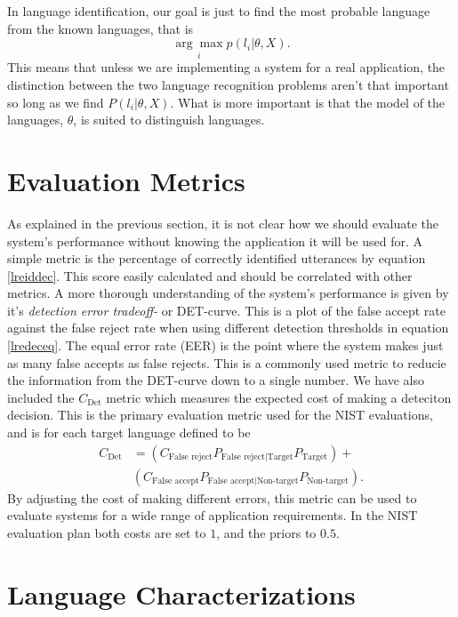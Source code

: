  In language identification, our goal is just to find the most probable language from the known languages, that is
\begin{equation}
\label{lreiddec}
\underset{i}{\arg \max} p(l_i | \theta, X).
\end{equation}
This means that unless we are implementing a system for a real application, the distinction between the two language recognition problems aren't that important so long as we find $P(l_i | \theta, X)$. What is more important is that the model of the languages, $\theta$, is suited to distinguish languages.

\section{Evaluation Metrics}

As explained in the previous section, it is not clear how we should evaluate the system's performance without knowing the application it will be used for. A simple metric is the percentage of correctly identified utterances by equation \ref{lreiddec}. This score easily calculated and should be correlated with other metrics. A more thorough understanding of the system's performance is given by it's \emph{detection error tradeoff-} or DET-curve. This is a plot of the false accept rate against the false reject rate when using different detection thresholds in equation \ref{lredeceq}. The equal error rate (EER) is the point where the system makes just as many false accepts as false rejects. This is a commonly used metric to reducie the information from the DET-curve down to a single number. We have also included the $C_{\text{Det}}$ metric which measures the expected cost of making a deteciton decision. This is the primary evaluation metric used for the NIST evaluations, and is for each target language defined to be \cite{martin2003nist}
\begin{align*}
C_{\text{Det}} &=(C_{\text{False reject}}P_{\text{False reject} | \text{Target}}P_{\text{Target}})+\\
&(C_{\text{False accept}}P_{\text{False accept} | \text{Non-target}}P_{\text{Non-target}}).
\end{align*}
By adjusting the cost of making different errors, this metric can be used to evaluate systems for a wide range of application requirements. In the NIST evaluation plan both costs are set to $1$, and the priors to $0.5$. 

\section{Language Characterizations}

